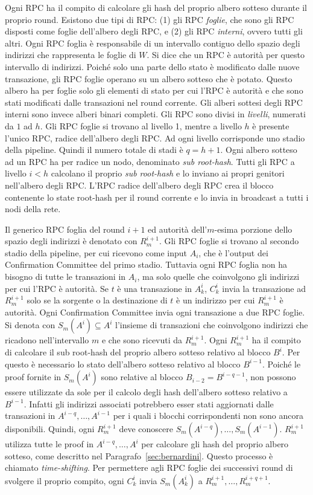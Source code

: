 Ogni RPC ha il compito di calcolare gli hash del proprio albero sotteso durante il proprio round. Esistono due tipi di RPC: (1) gli RPC \emph{foglie}, che sono gli RPC disposti come foglie dell'albero degli RPC, e (2) gli RPC \emph{interni}, ovvero tutti gli altri. Ogni RPC foglia è responsabile di un intervallo contiguo dello spazio degli indirizzi che rappresenta le foglie di $W$. Si dice che un RPC è autorità per questo intervallo di indirizzi. Poiché solo una parte dello stato è modificato dalle nuove transazione, gli RPC foglie operano su un albero sotteso che è potato. Questo albero ha per foglie solo gli elementi di stato per cui l'RPC è autorità e che sono stati modificati dalle transazioni nel round corrente. Gli alberi sottesi degli RPC interni sono invece alberi binari completi. Gli RPC sono divisi in \emph{livelli}, numerati da $1$ ad $h$. Gli RPC foglie si trovano al livello 1, mentre a livello $h$ è presente l'unico RPC, radice dell'albero degli RPC. Ad ogni livello corrisponde uno stadio della pipeline. Quindi il numero totale di stadi è $q = h+1$. Ogni albero sotteso ad un RPC ha per radice un nodo, denominato \emph{sub root-hash}. Tutti gli RPC a livello $i < h$ calcolano il proprio \emph{sub root-hash} e lo inviano ai propri genitori nell'albero degli RPC. L'RPC radice dell'albero degli RPC crea il blocco contenente lo state root-hash per il round corrente e lo invia in broadcast a tutti i nodi della rete.

Il generico RPC foglia del round $i+1$ ed autorità dell'$m$-esima porzione dello spazio degli indirizzi è denotato con $R_m^{i+1}$. Gli RPC foglie si trovano al secondo stadio della pipeline, per cui ricevono come input $A_i$, che è l'output dei Confirmation Committee del primo stadio. Tuttavia ogni RPC foglia non ha bisogno di tutte le transazioni in $A_i$, ma solo quelle che coinvolgono gli indirizzi per cui l'RPC è autorità. Se $t$ è una transazione in $A_k^i$, $C_k^i$ invia la transazione ad $R_m^{i+1}$ solo se la sorgente o la destinazione di $t$ è un indirizzo per cui $R_m^{i+1}$ è autorità. Ogni Confirmation Committee invia ogni transazione a due RPC foglie. Si denota con $S_m(A^i) \subseteq A^i$ l'insieme di transazioni che coinvolgono indirizzi che ricadono nell'intervallo $m$ e che sono ricevuti da $R_m^{i+1}$. Ogni $R_m^{i+1}$ ha il compito di calcolare il sub root-hash del proprio albero sotteso relativo al blocco $B^i$. Per questo è necessario lo stato dell'albero sotteso relativo al blocco $B^{i-1}$. Poiché le proof fornite in $S_m(A^i)$ sono relative al blocco $B_{i-2} = B^{i-q-1}$, non possono essere utilizzate da sole per il calcolo degli hash dell'albero sotteso relativo a $B^{i-1}$. Infatti gli indirizzi associati potrebbero esser stati aggiornati dalle transazioni in $A^{i-q}, \dots, A^{i-1}$ per i quali i blocchi corrispondenti non sono ancora disponibili. Quindi, ogni $R_m^{i+1}$ deve conoscere $S_m(A^{i-q}), \dots, S_m(A^{i-1})$. $R_m^{i+1}$ utilizza tutte le proof in $A^{i-q}, \dots, A^{i}$ per calcolare gli hash del proprio albero sotteso, come descritto nel Paragrafo~\ref{sec:bernardini}. Questo processo è chiamato \emph{time-shifting}. Per permettere agli RPC foglie dei successivi round di svolgere il proprio compito, ogni $C_k^i$ invia $S_m(A_k^i)$ a $R_m^{i+1}, \dots, R_m^{i+q+1}$.

